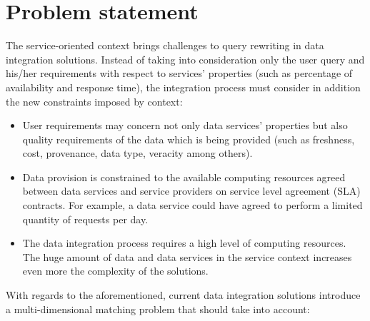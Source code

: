 
\section{Problem statement}\label{problem}
%
The service-oriented context brings challenges to query rewriting in data integration solutions.
%
Instead of taking into consideration only the user query and his/her requirements with respect to services' properties (such as percentage of availability and response time), the integration process must consider in addition the new constraints imposed by context: 
%
\begin{itemize}
\renewcommand{\labelitemi}{$-$}
\item User requirements may concern not only data services' properties but also quality requirements of the data which is being provided (such as freshness, cost, provenance, data type, veracity among others).
%
\item Data provision is constrained to the available computing resources agreed between data services and service providers on service level agreement (SLA) contracts. For example, a data service could have agreed to perform a limited quantity of requests per day.
%
\item The data integration process requires a high level of computing resources.
The huge amount of data and data services in the service context increases even 
more the complexity of the solutions.
\end{itemize}
%
With regards to the aforementioned, current data integration solutions introduce a multi-dimensional matching problem that should take into account:
%
